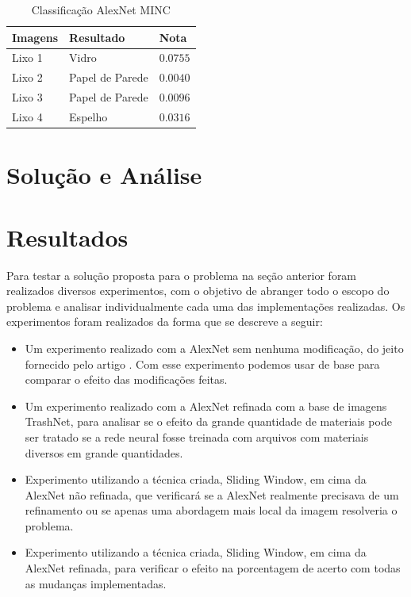 \documentclass[conference, compsoc, 12pt]{IEEEtran}
\begin{document}
\begin{table}[]
\centering
\caption{Classificação AlexNet MINC}
\label{Tabela 1}
\begin{tabular}{|l|l|l|}
\hline
Imagens & Resultado & Nota \\ \hline
Lixo 1 & Vidro & $0.0755$ \\ \hline
Lixo 2 & Papel de Parede & $0.0040$ \\ \hline
Lixo 3 & Papel de Parede & $0.0096$\\ \hline
Lixo 4 & Espelho & $0.0316$ \\ \hline
\end{tabular}
\end{table}

\section{Solução e Análise}

\section{Resultados}

Para testar a solução proposta para o problema na seção anterior foram realizados diversos experimentos, com o objetivo de abranger todo o escopo do problema e analisar individualmente cada uma das implementações realizadas. Os experimentos foram realizados da forma que se descreve a seguir:

\begin{itemize}
    \item Um experimento realizado com a AlexNet sem nenhuma modificação, do jeito fornecido pelo artigo \cite{Artigo principal}. Com esse experimento podemos usar de base para comparar o efeito das modificações feitas.
    \item Um experimento realizado com a AlexNet refinada com a base de imagens TrashNet, para analisar se o efeito da grande quantidade de materiais pode ser tratado se a rede neural fosse treinada com arquivos com materiais diversos em grande quantidades.
    \item Experimento utilizando a técnica criada, Sliding Window, em cima da AlexNet não refinada, que verificará se a AlexNet realmente precisava de um refinamento ou se apenas uma abordagem mais local da imagem resolveria o problema.
    \item Experimento utilizando a técnica criada, Sliding Window, em cima da AlexNet refinada, para verificar o efeito na porcentagem de acerto com todas as mudanças implementadas.
\end{itemize}
\end{document}
